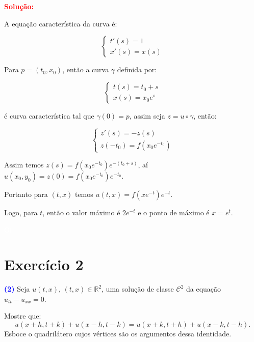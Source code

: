 \documentclass[11pt,a4paper]{article}
\newcommand{\exercicio}[1]{\section*{Exercício #1} \textcolor{blue}{\bf(#1)}}
\newcommand{\solucao}[1]{\begin{mdframed}[style=MyFrame]
\textbf{\textcolor{red}{Solução:}} #1
\end{mdframed}\textcolor{white}{Oi} \newline}
\begin{document}
\solucao{

A equação característica da curva é:

\[
\begin{cases}
    t'(s)=1 \\
    x'(s)=x(s)
\end{cases}
\]

\noindent
Para $p=(t_0,x_0)$, então a curva $\gamma$ definida por:

\[
\begin{cases}
    t(s)=t_0+s \\
    x(s)=x_0e^s
\end{cases}
\]

\noindent
é curva característica tal que $\gamma(0)=p$, assim seja $z=u\circ\gamma$, então:

\[
\begin{cases}
    z'(s)=-z(s) \\
    z(-t_0)=f(x_0e^{-t_0})
\end{cases}
\]

\noindent
Assim temos $z(s)=f(x_0e^{-t_0})e^{-(t_0+s)}$, aí $u(x_0,y_0)=z(0)=f(x_0e^{-t_0})e^{-t_0}$.

\medskip
\noindent
Portanto para $(t,x)$ temos $u(t,x)=f(xe^{-t})e^{-t}$.

\medskip
\noindent
Logo, para $t$, então o valor máximo é $2e^{-t}$ e o ponto de máximo é $x=e^t$.

}

\exercicio{2}
Seja $u(t, x)$, $(t, x) \in \mathbb{R}^2$, uma solução de classe $\mathcal{C}^2$ da equação $u_{tt}-u_{xx} = 0$.

\noindent
Mostre que:
\[
u(x + h, t + k) + u(x -  h, t - k) = u(x + k, t + h) + u(x - k, t - h).
\]
Esboce o quadrilátero cujos vértices são os argumentos dessa identidade.
\end{document}
